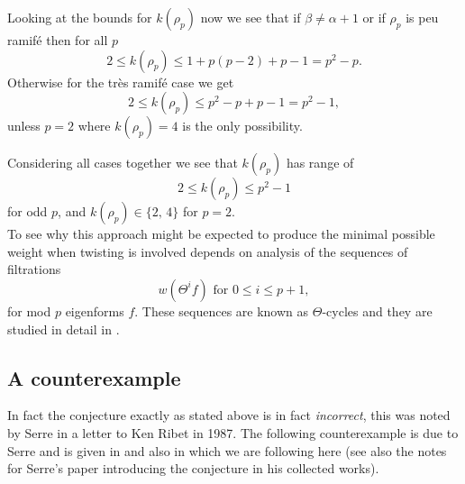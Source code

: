 \documentclass[a4paper,12pt]{article}
\begin{document}
Looking at the bounds for $k(\rho_p)$ now we see that if $\beta \ne \alpha + 1$ or if $\rho_p$ is peu ramif\'e then for all $p$
\[
2\le k(\rho_p) \le 1 + p(p-2) + p - 1 = p^2 - p.
\]
Otherwise for the tr\`es ramif\'e case we get
\[
2\le k(\rho_p) \le p^2 - p + p -1 = p^2 - 1,
\]
unless $p =2$ where $k(\rho_p) = 4$ is the only possibility.

Considering all cases together we see that $k(\rho_p)$ has range of
\[
2\le k(\rho_p) \le p^2 - 1
\]
for odd $p$, and $k(\rho_p) \in\{2,\,4\}$ for $p=2$.
\\[12pt] \noindent
To see why this approach might be expected to produce the minimal possible weight when twisting is involved depends on analysis of the sequences of filtrations
\[
w(\Theta^i f) \text{ for } 0 \le i \le p + 1,
\]
for mod $p$ eigenforms $f$.
These sequences are known as $\Theta$-cycles and they are studied in detail in \cite{Jochnowitz}.


\subsection{A counterexample}\label{subsec:counter}
In fact the conjecture exactly as stated above is in fact \emph{incorrect}, this was noted by Serre in a letter to Ken Ribet in 1987.
The following counterexample is due to Serre and is given in \cite[sec. 2]{Ribet95} and also in \cite[sec. 21.6.1]{RibetSteinBook} which we are following here (see also the notes for Serre's paper introducing the conjecture in his collected works).
\end{document}
